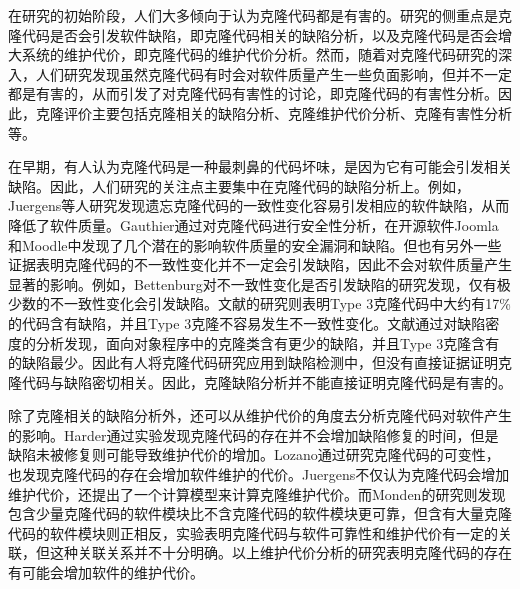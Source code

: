 在研究的初始阶段，人们大多倾向于认为克隆代码都是有害的。研究的侧重点是克隆代码是否会引发软件缺陷，即克隆代码相关的缺陷分析，以及克隆代码是否会增大系统的维护代价，即克隆代码的维护代价分析。然而，随着对克隆代码研究的深入，人们研究发现虽然克隆代码有时会对软件质量产生一些负面影响，但并不一定都是有害的，从而引发了对克隆代码有害性的讨论，即克隆代码的有害性分析。因此，克隆评价主要包括克隆相关的缺陷分析、克隆维护代价分析、克隆有害性分析等。

在早期，有人认为克隆代码是一种最刺鼻的代码坏味，是因为它有可能会引发相关缺陷。因此，人们研究的关注点主要集中在克隆代码的缺陷分析上。例如，Juergens等人研究发现遗忘克隆代码的一致性变化容易引发相应的软件缺陷，从而降低了软件质量\cite{juergens2009code,inoue2012experience}。Gauthier通过对克隆代码进行安全性分析，在开源软件Joomla和Moodle中发现了几个潜在的影响软件质量的安全漏洞和缺陷\cite{gauthier2013uncovering}。但也有另外一些证据表明克隆代码的不一致性变化并不一定会引发缺陷，因此不会对软件质量产生显著的影响。例如，Bettenburg对不一致性变化是否引发缺陷的研究发现，仅有极少数的不一致性变化会引发缺陷\cite{bettenburg2009empirical}。文献\cite{wagner2016relationship}的研究则表明Type 3克隆代码中大约有17\%的代码含有缺陷，并且Type 3克隆不容易发生不一致性变化。文献\cite{elish2015fault}通过对缺陷密度的分析发现，面向对象程序中的克隆类含有更少的缺陷，并且Type 3克隆含有的缺陷最少。因此有人将克隆代码研究应用到缺陷检测中，但没有直接证据证明克隆代码与缺陷密切相关\cite{lo2012active,kamei2011empirical}。因此，克隆缺陷分析并不能直接证明克隆代码是有害的。

除了克隆相关的缺陷分析外，还可以从维护代价的角度去分析克隆代码对软件产生的影响\cite{bakota2007clone}。Harder通过实验发现克隆代码的存在并不会增加缺陷修复的时间，但是缺陷未被修复则可能导致维护代价的增加\cite{harder2012controlled}。Lozano通过研究克隆代码的可变性，也发现克隆代码的存在会增加软件维护的代价\cite{lozano2008assessing}。Juergens不仅认为克隆代码会增加维护代价，还提出了一个计算模型来计算克隆维护代价\cite{juergens2010much}。而Monden的研究则发现包含少量克隆代码的软件模块比不含克隆代码的软件模块更可靠，但含有大量克隆代码的软件模块则正相反，实验表明克隆代码与软件可靠性和维护代价有一定的关联，但这种关联关系并不十分明确\cite{monden2002software}。以上维护代价分析的研究表明克隆代码的存在有可能会增加软件的维护代价。

